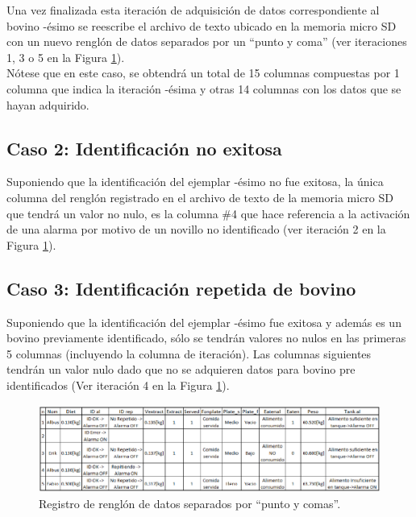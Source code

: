 Una vez finalizada esta iteración de adquisición de datos correspondiente al bovino -ésimo se reescribe el archivo de texto ubicado en la memoria micro SD con un nuevo renglón de datos separados por un ``punto y coma'' (ver iteraciones 1, 3 o 5 en la Figura \ref{ejsdtxtpng}).\\

Nótese que en este caso, se obtendrá un total de 15 columnas compuestas por 1 columna que indica la iteración -ésima y otras 14 columnas con los datos que se hayan adquirido. 

\subsection{Caso 2: Identificación no exitosa}

Suponiendo que la identificación del ejemplar -ésimo no fue exitosa, la única columna del renglón registrado en el archivo de texto de la memoria micro SD que tendrá un valor no nulo, es la columna \#4 que hace referencia a la activación de una alarma por motivo de un novillo no identificado (ver iteración 2 en la Figura \ref{ejsdtxtpng}).

\subsection{Caso 3: Identificación repetida de bovino}

Suponiendo que la identificación del ejemplar -ésimo fue exitosa y además es un bovino previamente identificado, sólo se tendrán valores no nulos en las primeras 5 columnas (incluyendo la columna de iteración). Las columnas siguientes tendrán un valor nulo dado que no se adquieren datos para bovino pre identificados (Ver iteración 4 en la Figura \ref{ejsdtxtpng}).\\
\pagebreak

\begin{figure}[H]
    \centering
    \includegraphics[scale=0.5, angle=90]{img/ejsdtxt.png}
    \caption{Registro de renglón de datos separados por ``punto y comas''.}
    \label{ejsdtxtpng}
\end{figure}
